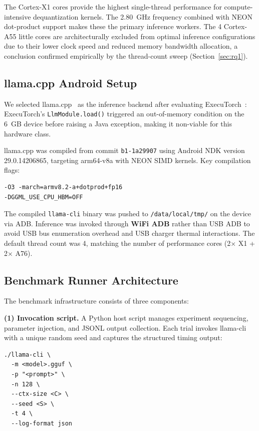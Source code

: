 \documentclass[conference]{IEEEtran}
\begin{document}
The Cortex-X1 cores provide the highest single-thread performance for
compute-intensive dequantization kernels. The 2.80~GHz frequency combined
with NEON dot-product support makes these the primary inference workers.
The 4 Cortex-A55 little cores are architecturally excluded from optimal
inference configurations due to their lower clock speed and reduced memory
bandwidth allocation, a conclusion confirmed empirically by the thread-count
sweep (Section~\ref{sec:rq1}).

\subsection{llama.cpp Android Setup}

We selected llama.cpp~\cite{llamacpp} as the inference backend after evaluating
ExecuTorch~\cite{executorch}: ExecuTorch's \texttt{LlmModule.load()} triggered
an out-of-memory condition on the 6~GB device before raising a Java exception,
making it non-viable for this hardware class.

llama.cpp was compiled from commit \texttt{b1-1a29907} using Android NDK
version 29.0.14206865, targeting arm64-v8a with NEON SIMD kernels. Key
compilation flags:
\begin{verbatim}
-O3 -march=armv8.2-a+dotprod+fp16
-DGGML_USE_CPU_HBM=OFF
\end{verbatim}

The compiled \texttt{llama-cli} binary was pushed to \texttt{/data/local/tmp/}
on the device via ADB. Inference was invoked through \textbf{WiFi ADB} rather
than USB ADB to avoid USB bus enumeration overhead and USB charger thermal
interactions. The default thread count was 4, matching the number of
performance cores (2$\times$ X1 + 2$\times$ A76).

\subsection{Benchmark Runner Architecture}

The benchmark infrastructure consists of three components:

\textbf{(1) Invocation script.} A Python host script manages experiment
sequencing, parameter injection, and JSONL output collection. Each trial
invokes llama-cli with a unique random seed and captures the structured
timing output:
\begin{verbatim}
./llama-cli \
  -m <model>.gguf \
  -p "<prompt>" \
  -n 128 \
  --ctx-size <C> \
  --seed <S> \
  -t 4 \
  --log-format json
\end{verbatim}
\end{document}
